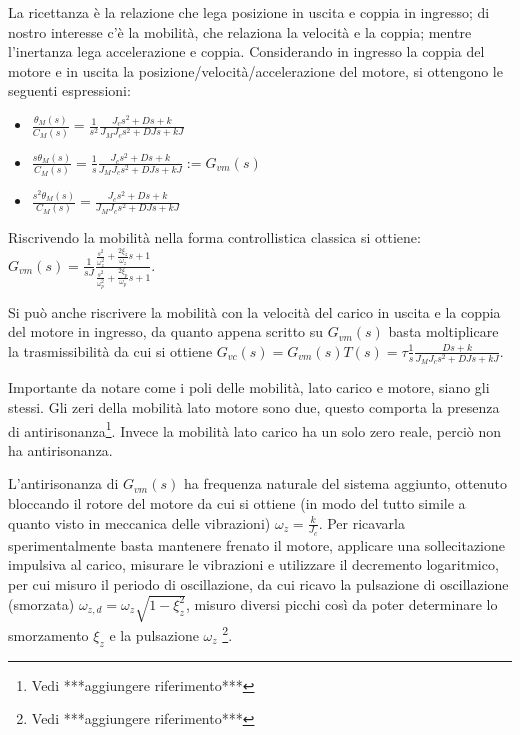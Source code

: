 La ricettanza è la relazione che lega posizione in uscita e coppia in ingresso; di nostro interesse c'è la mobilità, che relaziona la velocità e la coppia; mentre l'inertanza lega accelerazione e coppia.
Considerando in ingresso la coppia del motore e in uscita la posizione/velocità/accelerazione del motore, si ottengono le seguenti espressioni:
\begin{itemize}
    \item \(\frac{\theta_M(s)}{C_M(s)} = \frac{1}{s^2} \frac{J_c s^2 + D s + k}{J_M J_c s^2 + D J s + k J} \)
    \item \(\frac{s \theta_M(s)}{C_M(s)} = \frac{1}{s} \frac{J_c s^2 + D s + k}{J_M J_c s^2 + D J s + k J} := G_{vm}(s) \)
    \item \(\frac{s^2 \theta_M(s)}{C_M(s)} = \frac{J_c s^2 + D s + k}{J_M J_c s^2 + D J s + k J} \)
\end{itemize}

Riscrivendo la mobilità nella forma controllistica classica si ottiene:
\(G_{vm}(s) = \frac{1}{sJ} \frac{\frac{s^2}{\omega_z^2} + \frac{2\xi_z}{\omega_z} s + 1}{\frac{s^2}{\omega_p^2} + \frac{2\xi_p}{\omega_p} s + 1}\).

Si può anche riscrivere la mobilità con la velocità del carico in uscita e la coppia del motore in ingresso, da quanto appena scritto su \(G_{vm}(s)\) basta moltiplicare la trasmissibilità da cui si ottiene \(G_{vc}(s) = G_{vm}(s) T(s) = \tau \frac{1}{s} \frac{D s + k}{J_M J_c s^2 + D J s + k J}\).

Importante da notare come i poli delle mobilità, lato carico e motore, siano gli stessi.
Gli zeri della mobilità lato motore sono due, questo comporta la presenza di antirisonanza\footnote{Vedi ***aggiungere riferimento***}. Invece la mobilità lato carico ha un solo zero reale, perciò non ha antirisonanza.

L'antirisonanza di \(G_{vm}(s)\) ha frequenza naturale del sistema aggiunto, ottenuto bloccando il rotore del motore da cui si ottiene (in modo del tutto simile a quanto visto in meccanica delle vibrazioni) \(\omega_z=\frac{k}{J_c}\).
Per ricavarla sperimentalmente basta mantenere frenato il motore, applicare una sollecitazione impulsiva al carico, misurare le vibrazioni e utilizzare il decremento logaritmico, per cui misuro il periodo di oscillazione, da cui ricavo la pulsazione di oscillazione (smorzata) \(\omega_{z,d} = \omega_z \sqrt{1-\xi_z^2}\), misuro diversi picchi così da poter determinare lo smorzamento \(\xi_z\) e la pulsazione \(\omega_z\) \footnote{Vedi ***aggiungere riferimento***}.

